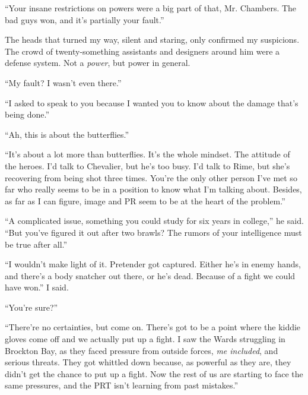 ``Your insane restrictions on powers were a big part of that, Mr. Chambers.  The bad guys won, and it's partially your fault.''



The heads that turned my way, silent and staring, only confirmed my suspicions.  The crowd of twenty-something assistants and designers around him were a defense system.  Not a \emph{power}, but power in general.



``My fault? I wasn't even there.''



``I asked to speak to you because I wanted you to know about the damage that's being done.''



``Ah, this is about the butterflies.''



``It's about a lot more than butterflies.  It's the whole mindset.  The attitude of the heroes.  I'd talk to Chevalier, but he's too busy.  I'd talk to Rime, but she's recovering from being shot three times.  You're the only other person I've met so far who really seems to be in a position to know what I'm talking about.  Besides, as far as I can figure, image and PR seem to be at the heart of the problem.''



``A complicated issue, something you could study for six years in college,'' he said.  ``But you've figured it out after two brawls?  The rumors of your intelligence must be true after all.''



``I wouldn't make light of it.  Pretender got captured.  Either he's in enemy hands, and there's a body snatcher out there, or he's dead.  Because of a fight we could have won.'' I said.



``You're sure?''



``There're no certainties, but come on.  There's got to be a point where the kiddie gloves come off and we actually put up a fight.  I saw the Wards struggling in Brockton Bay, as they faced pressure from outside forces, \emph{me included}, and serious threats.  They got whittled down because, as powerful as they are, they didn't get the chance to put up a fight.  Now the rest of us are starting to face the same pressures, and the PRT isn't learning from past mistakes.''



